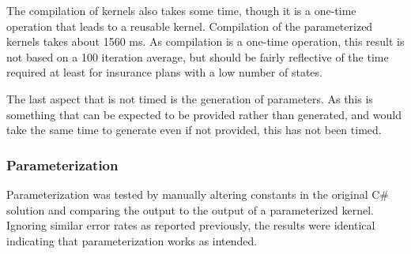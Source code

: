 The compilation of kernels also takes some time, though it is a one-time operation that leads to a reusable kernel.
Compilation of the parameterized kernels takes about 1560 ms.
As compilation is a one-time operation, this result is not based on a 100 iteration average, but should be fairly reflective of the time required at least for insurance plans with a low number of states.

The last aspect that is not timed is the generation of parameters.
As this is something that can be expected to be provided rather than generated, and would take the same time to generate even if not provided, this has not been timed.

\subsubsection{Parameterization}
Parameterization was tested by manually altering constants in the original C\# solution and comparing the output to the output of a parameterized kernel. 
Ignoring similar error rates as reported previously, the results were identical indicating that parameterization works as intended.